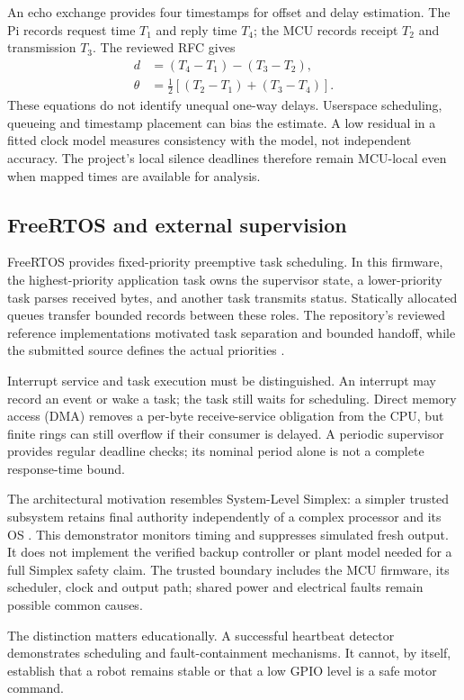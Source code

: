 \documentclass[a4paper,11pt]{article}
\newcommand{\page}{\clearpage}
\begin{document}
An echo exchange provides four timestamps for offset and delay estimation. The Pi records request time $T_1$ and reply time $T_4$; the MCU records receipt $T_2$ and transmission $T_3$. The reviewed RFC gives \cite{sntp}
\begin{align}
 d&=(T_4-T_1)-(T_3-T_2),\\
 \theta&=\tfrac12[(T_2-T_1)+(T_3-T_4)].
\end{align}
These equations do not identify unequal one-way delays. Userspace scheduling, queueing and timestamp placement can bias the estimate. A low residual in a fitted clock model measures consistency with the model, not independent accuracy. The project's local silence deadlines therefore remain MCU-local even when mapped times are available for analysis.
\subsection{FreeRTOS and external supervision}
FreeRTOS provides fixed-priority preemptive task scheduling. In this firmware, the highest-priority application task owns the supervisor state, a lower-priority task parses received bytes, and another task transmits status. Statically allocated queues transfer bounded records between these roles. The repository's reviewed reference implementations motivated task separation and bounded handoff, while the submitted source defines the actual priorities \cite{r6}.

Interrupt service and task execution must be distinguished. An interrupt may record an event or wake a task; the task still waits for scheduling. Direct memory access (DMA) removes a per-byte receive-service obligation from the CPU, but finite rings can still overflow if their consumer is delayed. A periodic supervisor provides regular deadline checks; its nominal period alone is not a complete response-time bound.

The architectural motivation resembles System-Level Simplex: a simpler trusted subsystem retains final authority independently of a complex processor and its OS \cite{simplex}. This demonstrator monitors timing and suppresses simulated fresh output. It does not implement the verified backup controller or plant model needed for a full Simplex safety claim. The trusted boundary includes the MCU firmware, its scheduler, clock and output path; shared power and electrical faults remain possible common causes.

The distinction matters educationally. A successful heartbeat detector demonstrates scheduling and fault-containment mechanisms. It cannot, by itself, establish that a robot remains stable or that a low GPIO level is a safe motor command.
\page
\end{document}
